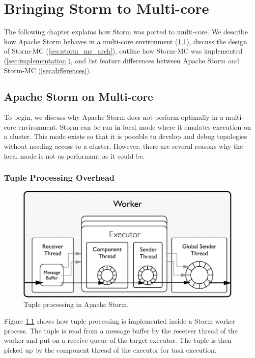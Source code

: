 \chapter{Bringing Storm to Multi-core}

The following chapter explains how Storm was ported to multi-core. We describe how Apache Storm behaves in a multi-core environment (\ref{sec:storm_on_mc}), discuss the design of Storm-MC (\ref{sec:storm_mc_arch}), outline how Storm-MC was implemented (\ref{sec:implementation}), and list feature differences between Apache Storm and Storm-MC (\ref{sec:differences}).

\section{Apache Storm on Multi-core}
\label{sec:storm_on_mc}

To begin, we discuss why Apache Storm does not perform optimally in a multi-core environment. Storm can be ran in local mode where it emulates execution on a cluster. This mode exists so that it is possible to develop and debug topologies without needing access to a cluster. However, there are several reasons why the local mode is not as performant as it could be.

\subsection{Tuple Processing Overhead}

\begin{figure}[!htb]
	\centering
	\includegraphics[scale=0.7]{pdf/worker_inside.pdf}
	\caption{Tuple processing in Apache Storm.}
	\label{fig:worker_inside}
\end{figure}

Figure \ref{fig:worker_inside} shows how tuple processing is implemented inside a Storm worker process. The tuple is read from a message buffer by the receiver thread of the worker and put on a receive queue of the target executor. The tuple is then picked up by the component thread of the executor for task execution.

